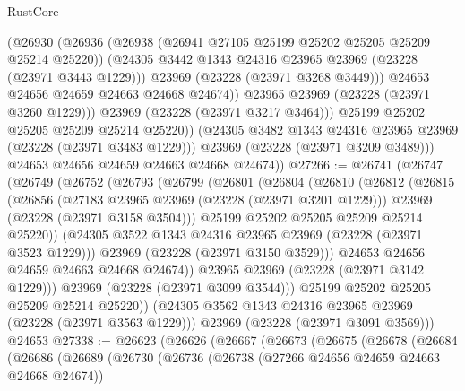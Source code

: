 \begin{lexlean}{RustCore}
\begin{coremodule}
                    (@26930
                      (@26936
                        (@26938 (@26941 @27105 @25199 @25202 @25205 @25209 @25214 @25220))
                        (@24305 @3442 @1343 @24316 @23965 @23969 (@23228 (@23971 @3443 @1229)))
                        @23969
                        (@23228 (@23971 @3268 @3449)))
                      @24653
                      @24656
                      @24659
                      @24663
                      @24668
                      @24674))
                  @23965
                  @23969
                  (@23228 (@23971 @3260 @1229)))
                @23969
                (@23228 (@23971 @3217 @3464)))
              @25199
              @25202
              @25205
              @25209
              @25214
              @25220))
          (@24305 @3482 @1343 @24316 @23965 @23969 (@23228 (@23971 @3483 @1229)))
          @23969
          (@23228 (@23971 @3209 @3489)))
        @24653
        @24656
        @24659
        @24663
        @24668
        @24674))
@27266 := @26741
    (@26747
      (@26749
        (@26752
          (@26793
            (@26799
              (@26801
                (@26804
                  (@26810
                    (@26812
                      (@26815
                        (@26856
                          (@27183 @23965 @23969 (@23228 (@23971 @3201 @1229)))
                          @23969
                          (@23228 (@23971 @3158 @3504)))
                        @25199
                        @25202
                        @25205
                        @25209
                        @25214
                        @25220))
                    (@24305 @3522 @1343 @24316 @23965 @23969 (@23228 (@23971 @3523 @1229)))
                    @23969
                    (@23228 (@23971 @3150 @3529)))
                  @24653
                  @24656
                  @24659
                  @24663
                  @24668
                  @24674))
              @23965
              @23969
              (@23228 (@23971 @3142 @1229)))
            @23969
            (@23228 (@23971 @3099 @3544)))
          @25199
          @25202
          @25205
          @25209
          @25214
          @25220))
      (@24305 @3562 @1343 @24316 @23965 @23969 (@23228 (@23971 @3563 @1229)))
      @23969
      (@23228 (@23971 @3091 @3569)))
    @24653
@27338 := @26623
    (@26626
      (@26667
        (@26673
          (@26675
            (@26678
              (@26684
                (@26686
                  (@26689
                    (@26730
                      (@26736
                        (@26738 (@27266 @24656 @24659 @24663 @24668 @24674))

\end{coremodule}
\end{lexlean}

